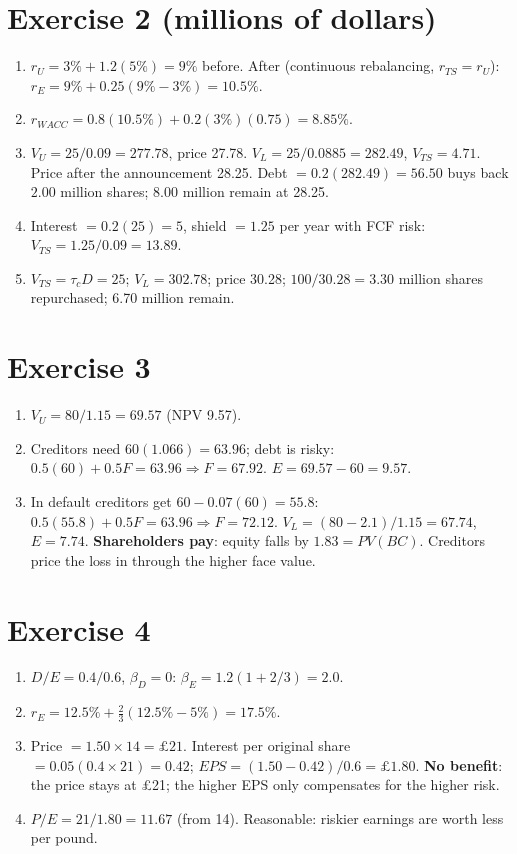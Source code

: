 \documentclass[11pt,a4paper]{article}
\begin{document}
\section*{Exercise 2 \normalsize(millions of dollars)}

\begin{enumerate}[label=(\alph*)]
  \item $r_U = 3\% + 1.2(5\%) = 9\%$ before. After (continuous rebalancing, $r_{TS} = r_U$):
        $r_E = 9\% + 0.25(9\% - 3\%) = 10.5\%$.
  \item $r_{WACC} = 0.8(10.5\%) + 0.2(3\%)(0.75) = 8.85\%$.
  \item $V_U = 25/0.09 = 277.78$, price 27.78. $V_L = 25/0.0885 = 282.49$, $V_{TS} = 4.71$.
        Price after the announcement 28.25. Debt $= 0.2(282.49) = 56.50$ buys back $2.00$ million shares;
        8.00 million remain at 28.25.
  \item Interest $= 0.2(25) = 5$, shield $= 1.25$ per year with FCF risk: $V_{TS} = 1.25/0.09 = 13.89$.
  \item $V_{TS} = \tau_c D = 25$; $V_L = 302.78$; price 30.28; $100/30.28 = 3.30$ million shares
        repurchased; 6.70 million remain.
\end{enumerate}

\section*{Exercise 3}

\begin{enumerate}[label=(\alph*)]
  \item $V_U = 80/1.15 = 69.57$ (NPV 9.57).
  \item Creditors need $60(1.066) = 63.96$; debt is risky: $0.5(60) + 0.5F = 63.96 \Rightarrow F = 67.92$.
        $E = 69.57 - 60 = 9.57$.
  \item In default creditors get $60 - 0.07(60) = 55.8$: $0.5(55.8) + 0.5F = 63.96 \Rightarrow F = 72.12$.
        $V_L = (80 - 2.1)/1.15 = 67.74$, $E = 7.74$. \textbf{Shareholders pay}: equity falls by
        $1.83 = PV(BC)$. Creditors price the loss in through the higher face value.
\end{enumerate}

\section*{Exercise 4}

\begin{enumerate}[label=(\alph*)]
  \item $D/E = 0.4/0.6$, $\beta_D = 0$: $\beta_E = 1.2(1 + 2/3) = 2.0$.
  \item $r_E = 12.5\% + \frac{2}{3}(12.5\% - 5\%) = 17.5\%$.
  \item Price $= 1.50 \times 14 = \pounds21$. Interest per original share $= 0.05(0.4 \times 21) = 0.42$;
        $EPS = (1.50 - 0.42)/0.6 = \pounds1.80$. \textbf{No benefit}: the price stays at \pounds21; the
        higher EPS only compensates for the higher risk.
  \item $P/E = 21/1.80 = 11.67$ (from 14). Reasonable: riskier earnings are worth less per pound.
\end{enumerate}
\end{document}
